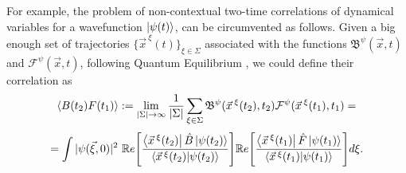 \documentclass[11pt, a4paper]{article} %
\newcommand{\B}{\mathfrak{B}}
\begin{document}
For example, the problem of non-contextual two-time correlations of dynamical variables for a wavefunction $\ket{\psi(t)}$, can be circumvented as follows. Given a big enough set of trajectories $\{\vec{x}^{\:\xi}(t)\}_{\xi\in \Sigma}$ associated with the functions $\B^\psi(\vec{x},t)$ and $\mathcal{F}^\psi(\vec{x},t)$, following Quantum Equilibrium \cite{Absolute}, we could define their correlation as\vspace{-0.1cm}
\begin{equation}
\langle B(t_2)F(t_1)\rangle := \lim_{|\Sigma|\rightarrow \infty}\frac{1}{|\Sigma|} \sum_{\xi\in\Sigma} \B^\psi(\vec{x}^{\:\xi}(t_2),t_2)\mathcal{F}^\psi(\vec{x}^{\:\xi}(t_1),t_1) =\vspace{-0.05cm}
\end{equation}
$$
=  \int |\psi(\vec{\xi},0)|^2\ \mathbb{R}e\qty[ \frac{\bra{\vec{x}^{\:\xi}(t_2)}\hat{B}\ket{\psi(t_2)}}{\bra{\vec{x}^{\:\xi}(t_2)}\ket{\psi(t_2)}} ] \mathbb{R}e\qty[ \frac{\bra{\vec{x}^{\:\xi}(t_1)}\hat{F}\ket{\psi(t_1)}}{\bra{\vec{x}^{\:\xi}(t_1)}\ket{\psi(t_1)}} ]d\xi.
$$
\end{document}
